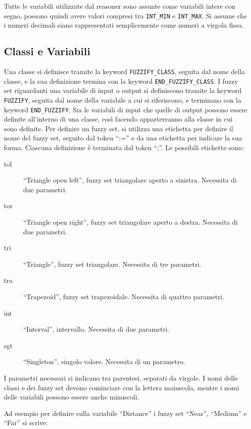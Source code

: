 Tutte le variabili utilizzate dal reasoner sono assunte come variabili intere con segno, possono quindi avere valori compresi tra \verb|INT_MIN| e \verb|INT_MAX|.
Si assume che i numeri decimali siano rappresentati semplicemente come numeri a virgola fissa.

\subsection{Classi e Variabili}
Una classe si definisce tramite la keyword \verb|FUZZIFY_CLASS|, seguita dal nome della classe, e la sua definizione termina con la keyword \verb|END_FUZZIFY_CLASS|.
I fuzzy set riguardanti una variabile di input o output si definiscono tramite la keyword \verb|FUZZIFY|, seguita dal nome della variabile a cui si riferiscono, e terminano con la keyword \verb|END_FUZZIFY|.
Sia le variabili di input che quelle di output possono essere definite all'interno di una classe, così facendo apparterranno alla classe in cui sono definite.
Per definire un fuzzy set, si utilizza una etichetta per definire il nome del fuzzy set, seguito dal token ``:='' e da una etichetta per indicare la sua forma. Ciascuna definizione è terminata dal token ``;''. Le possibili etichette sono:

\begin{description}
 \item [tol] ``Triangle open left'', fuzzy set triangolare aperto a sinistra. Necessita di due parametri.
 \item [tor] ``Triangle open right'', fuzzy set triangolare aperto a destra. Necessita di due parametri.
 \item [tri] ``Triangle'', fuzzy set triangolare. Necessita di tre parametri.
 \item [tra] ``Trapezoid'', fuzzy set trapezoidale. Necessita di quattro parametri.
 \item [int] ``Interval'', intervallo. Necessita di due parametri.
 \item [sgt] ``Singleton'', singolo valore. Necessita di un parametro.
\end{description}

I parametri necessari si indicano tra parentesi, separati da virgole.
I nomi delle classi e dei fuzzy set devono cominciare con la lettera maiuscola, mentre i nomi delle variabili possono essere anche minuscoli.


Ad esempio per definire sulla variabile ``Distance'' i fuzzy set ``Near'', ``Medium'' e ``Far'' si scrive:

